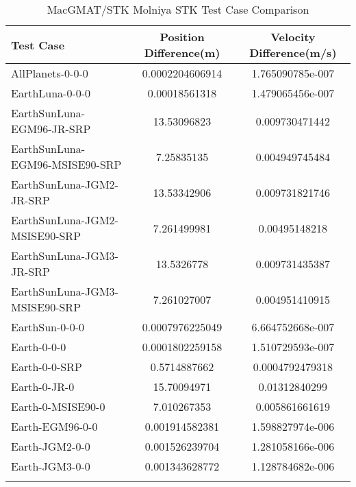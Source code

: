 \begin{table}[htbp!]
\centering
\caption{ MacGMAT/STK Molniya STK Test Case Comparison}
      \begin{tabular}{lcc}
      \hline\hline
          Test Case & Position Difference(m) & Velocity Difference(m/s) \\
         \hline
         AllPlanets-0-0-0 & 0.0002204606914 & 1.765090785e-007 \\
         EarthLuna-0-0-0 & 0.00018561318 & 1.479065456e-007 \\
         EarthSunLuna-EGM96-JR-SRP & 13.53096823 & 0.009730471442 \\
         EarthSunLuna-EGM96-MSISE90-SRP & 7.25835135 & 0.004949745484 \\
         EarthSunLuna-JGM2-JR-SRP & 13.53342906 & 0.009731821746 \\
         EarthSunLuna-JGM2-MSISE90-SRP & 7.261499981 & 0.00495148218 \\
         EarthSunLuna-JGM3-JR-SRP & 13.5326778 & 0.009731435387 \\
         EarthSunLuna-JGM3-MSISE90-SRP & 7.261027007 & 0.004951410915 \\
         EarthSun-0-0-0 & 0.0007976225049 & 6.664752668e-007 \\
         Earth-0-0-0 & 0.0001802259158 & 1.510729593e-007 \\
         Earth-0-0-SRP & 0.5714887662 & 0.0004792479318 \\
         Earth-0-JR-0 & 15.70094971 & 0.01312840299 \\
         Earth-0-MSISE90-0 & 7.010267353 & 0.005861661619 \\
         Earth-EGM96-0-0 & 0.001914582381 & 1.598827974e-006 \\
         Earth-JGM2-0-0 & 0.001526239704 & 1.281058166e-006 \\
         Earth-JGM3-0-0 & 0.001343628772 & 1.128784682e-006 \\
      \hline\hline
      \label{Table: Molniya STK Table} 
\end{tabular}
\end{table}
